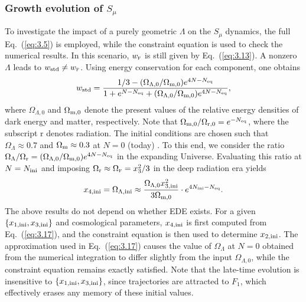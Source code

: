 \documentclass[aps,prd,twocolumn]{revtex4-2}
\newcommand\subeq{{\rm eq}}
\newcommand\subF{\textsc{f}}
\newcommand\subini{{\rm ini}}
\newcommand\substd{{\rm std}}
\begin{document}
\subsubsection{Growth evolution of $S_\mu$}\label{sec:III.B.1}
To investigate the impact of a purely geometric $\Lambda$ on the $S_\mu$ dynamics, the full Eq.~(\ref{eq:3.5}) is employed, while the constraint equation is used to check the numerical results. In this scenario, $w_\subF$ is still given by Eq.~(\ref{eq:3.13}). A nonzero $\Lambda$ leads to $w_\substd\neq w_\subF$. Using energy conservation for each component, one obtains
\begin{equation}
  w_\substd = \frac{1/3-(\Omega_{\Lambda,0}/\Omega_{{\rm m},0})e^{4N-N_\subeq}}{1+e^{N-N_\subeq}+(\Omega_{\Lambda,0}/\Omega_{{\rm m},0})e^{4N-N_\subeq}},
\end{equation}
where $\Omega_{\Lambda,0}$ and $\Omega_{{\rm m},0}$ denote the present values of the relative energy densities of dark energy and matter, respectively. Note that $\Omega_{{\rm m},0}/\Omega_{{\rm r},0}=e^{-N_\subeq}$, where the subscript $\mathrm{r}$ denotes radiation. The initial conditions are chosen such that $\Omega_\Lambda\approx0.7$ and $\Omega_{\rm m}\approx0.3$ at $N=0$ (today) \cite{Aghanim2020.AaA.641.A6}. To this end, we consider the ratio $\Omega_\Lambda/\Omega_{\rm r} = (\Omega_{\Lambda,0}/\Omega_{{\rm m},0}) e^{4N-N_\subeq}$ in the expanding Universe. Evaluating this ratio at $N=N_\subini$ and imposing $\Omega_{\rm r}\approx\Omega_\subF=x_3^2/3$ in the deep radiation era yields
\begin{equation}\label{eq:3.17}
  x_{4,\subini} = \Omega_{\Lambda,\subini}
  \approx \frac{\Omega_{\Lambda,0}x_{3,\subini}^2}{3\Omega_{{\rm m},0}} \cdot e^{4N_\subini-N_\subeq}.
\end{equation}
The above results do not depend on whether EDE exists. For a given $\{x_{1,\subini}, x_{3,\subini}\}$ and cosmological parameters, $x_{4,\subini}$ is first computed from Eq.~(\ref{eq:3.17}), and the constraint equation is then used to determine $x_{2,\subini}$. The approximation used in Eq.~(\ref{eq:3.17}) causes the value of $\Omega_\Lambda$ at $N=0$ obtained from the numerical integration to differ slightly from the input $\Omega_{\Lambda,0}$, while the constraint equation remains exactly satisfied. Note that the late-time evolution is insensitive to $\{x_{1,\subini}, x_{3,\subini}\}$, since trajectories are attracted to $F_1$, which effectively erases any memory of these initial values.
\end{document}

